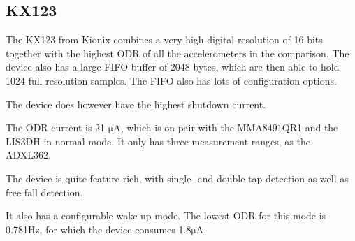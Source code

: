 \subsection{KX123}

The KX123 from Kionix combines a very high digital resolution of 16-bits together with the highest ODR of all the accelerometers in the comparison. The device also has a large FIFO buffer of 2048 bytes, which are then able to hold 1024 full resolution samples. The FIFO also has lots of configuration options. 

The device does however have the highest shutdown current. 

The ODR current is 21 $\si{\micro\ampere}$, which is on pair with the MMA8491QR1 and the LIS3DH in normal mode. It only has three measurement ranges, as the ADXL362.

The device is quite feature rich, with single- and double tap detection as well as free fall detection.

It also has a configurable wake-up mode. The lowest ODR for this mode is 0.781Hz, for which the device consumes 1.8$\si{\micro\ampere}$. 